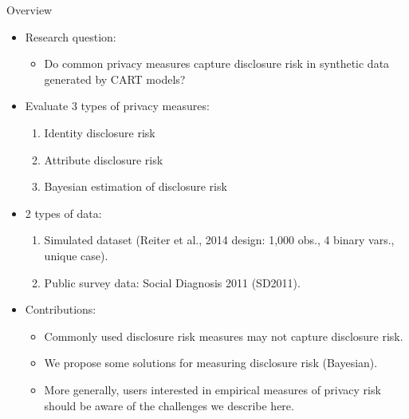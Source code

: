 \documentclass[t,8pt,utfx8]{beamer}
\begin{document}
\begin{spacing}{1.25}
\begin{frame}{Overview}
\begin{itemize}
    \item Research question:
    \begin{itemize}
        \item Do common privacy measures capture disclosure risk in synthetic data generated by CART models?
    \end{itemize}
    \item Evaluate 3 types of privacy measures:
    \begin{enumerate}
        \item Identity disclosure risk
        \item Attribute disclosure risk
        \item Bayesian estimation of disclosure risk
    \end{enumerate}
    \item 2 types of data:
    \begin{enumerate}
        \item Simulated dataset (Reiter et al., 2014 design: 1,000 obs., 4 binary vars., unique case).
        \item Public survey data: Social Diagnosis 2011 (SD2011).
    \end{enumerate}
    \item Contributions: 
    \begin{itemize}
        \item Commonly used disclosure risk measures may not capture disclosure risk. 
        \item We propose some solutions for measuring disclosure risk (Bayesian).  
        \item More generally, users interested in empirical measures of privacy risk should be aware of the challenges we describe here.
    \end{itemize}
\end{itemize}
\end{frame}



\end{spacing}
\end{document}
